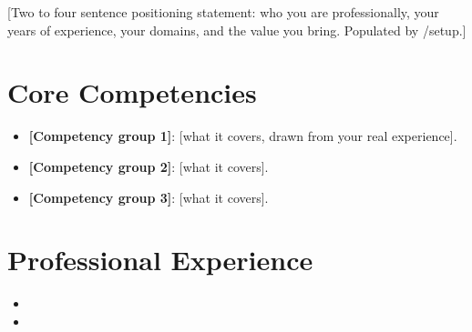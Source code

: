 \documentclass[11pt,a4paper,sans]{moderncv}
\begin{document}
\makecvtitle


\vspace{6pt}
\small{[Two to four sentence positioning statement: who you are professionally, your years of experience, your domains, and the value you bring. Populated by /setup.]}


\section{Core Competencies}
\vspace{1pt}
\begin{itemize}

\item \textbf{[Competency group 1]}: [what it covers, drawn from your real experience].

\item \textbf{[Competency group 2]}: [what it covers].

\item \textbf{[Competency group 3]}: [what it covers].

\end{itemize}


\section{Professional Experience}
\vspace{3pt}
\begin{itemize}

\item{}

\vspace{3pt}

\item{}

\end{itemize}
\end{document}
